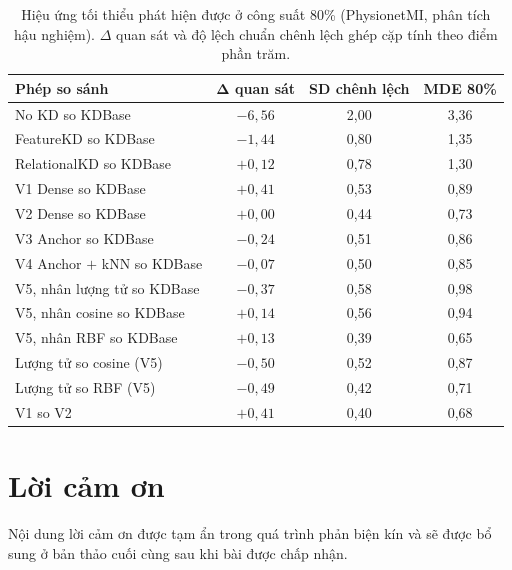 \begin{table}[!htbp]
\centering
\caption{Hiệu ứng tối thiểu phát hiện được ở công suất 80\% (PhysionetMI, phân tích hậu nghiệm). $\Delta$ quan sát và độ lệch chuẩn chênh lệch ghép cặp tính theo điểm phần trăm.}
\label{tab:mde}
\small
\begin{tabular}{lccc}
\toprule
\textbf{Phép so sánh} & $\boldsymbol{\Delta}$ \textbf{quan sát} & \textbf{SD chênh lệch} & \textbf{MDE 80\%} \\
\midrule
No KD so KDBase & $-6{,}56$ & 2{,}00 & 3{,}36 \\
FeatureKD so KDBase & $-1{,}44$ & 0{,}80 & 1{,}35 \\
RelationalKD so KDBase & $+0{,}12$ & 0{,}78 & 1{,}30 \\
V1 Dense so KDBase & $+0{,}41$ & 0{,}53 & 0{,}89 \\
V2 Dense so KDBase & $+0{,}00$ & 0{,}44 & 0{,}73 \\
V3 Anchor so KDBase & $-0{,}24$ & 0{,}51 & 0{,}86 \\
V4 Anchor $+$ kNN so KDBase & $-0{,}07$ & 0{,}50 & 0{,}85 \\
V5, nhân lượng tử so KDBase & $-0{,}37$ & 0{,}58 & 0{,}98 \\
V5, nhân cosine so KDBase & $+0{,}14$ & 0{,}56 & 0{,}94 \\
V5, nhân RBF so KDBase & $+0{,}13$ & 0{,}39 & 0{,}65 \\
\midrule
Lượng tử so cosine (V5) & $-0{,}50$ & 0{,}52 & 0{,}87 \\
Lượng tử so RBF (V5) & $-0{,}49$ & 0{,}42 & 0{,}71 \\
V1 so V2 & $+0{,}41$ & 0{,}40 & 0{,}68 \\
\bottomrule
\end{tabular}
\end{table}
\FloatBarrier

\section*{Lời cảm ơn}

Nội dung lời cảm ơn được tạm ẩn trong quá trình phản biện kín và sẽ
được bổ sung ở bản thảo cuối cùng sau khi bài được chấp nhận.

